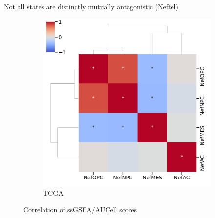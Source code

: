 \documentclass[aspectratio=169,9pt]{beamer}
\begin{document}
\begin{frame}{Not all states are distinctly mutually antagonistic (Neftel)}
\begin{adjustwidth}{-5cm}{-5cm}
\begin{figure}
\begin{subfigure}[c]{0.4\textwidth}
                    \includegraphics[width=\textwidth]{GSEA_TCGA_corrplot_Nef}
                    \caption{TCGA}
                \end{subfigure}
                \caption{Correlation of ssGSEA/AUCell scores}
            \end{figure}
        \end{adjustwidth}
    \end{frame}
\end{document}
